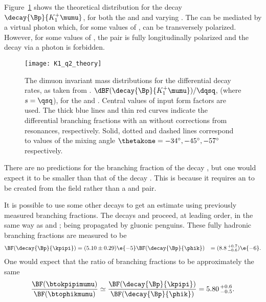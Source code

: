 Figure~\ref{fig:th:thetak1} shows the theoretical \qsq distribution for the decay
$\decay{\Bp}{K_1^+\mumu}$, for both the  and  and varying \thetakone.
The  can be mediated by a virtual photon which, for some values of \thetakone, can
be transversely polarized.
However, for some values of \thetakone, the \mumu pair is fully longitudinally polarized and the
decay via a photon is forbidden.

\begin{figure}
  \begin{center}
    \texttt{[image: K1\_q2\_theory]}
    \caption[Theoretical \qsq distribution for $\decay{\Bp}{K_1^+\mumu}$]
    {
      The dimuon invariant mass distributions for the differential decay rates, as taken from
      .
      $\dBF(\decay{\Bp}{K_1^+\mumu})/\dqsq$, (where $s=\qsq$), for the  and .
      Central values of input form factors are used.
      The thick blue lines and thin red curves indicate the differential branching fractions with
      an without corrections from resonances, respectively.
      Solid, dotted and dashed lines correspond to values of the mixing angle
      $\thetakone=-34^\circ,-45^\circ,-57^\circ$ respectively.
    }
    \label{fig:th:thetak1}
  \end{center}
\end{figure}

There are no predictions for the branching fraction of the decay \btophikmumu,
but one would expect it to be smaller than that of the decay \btokpipimumu.
This is because it requires an \ssbar to be created from the \QCD field rather than a \uubar and
\ddbar pair.

It is possible to use some other decays to get an estimate using previously measured branching
fractions.
The decays \decay{\Bp}{\kpipi} and \decay{\Bp}{\phik} proceed, at leading order, in the same way as
\btokpipimumu and \btophikmumu; being propagated by gluonic penguins.
These fully hadronic branching fractions are measured to be
\begin{align*}
  \BF(\decay{\Bp}{\kpipi}) &= (5.10\pm0.29)\e{-5}
  \BF(\decay{\Bp}{\phik}) &= (8.8\,^{+0.7}_{-0.6})\e{-6}.
\end{align*}
One would expect that the ratio of branching fractions to be approximately the same
\begin{equation}
  \frac{\BF(\btokpipimumu)}{\BF(\btophikmumu)}
  \simeq
  \frac{\BF(\decay{\Bp}{\kpipi})}{\BF(\decay{\Bp}{\phik})}
  =
  5.80\,^{+0.6}_{-0.5}.
\end{equation}


